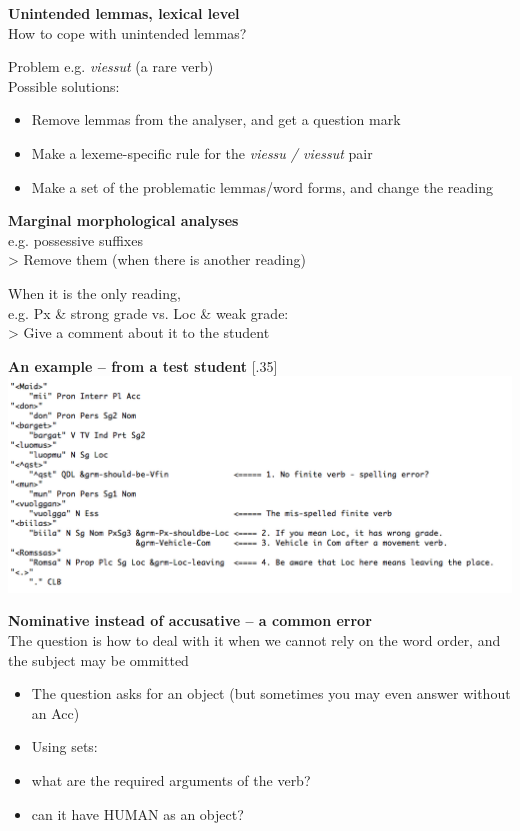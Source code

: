 \documentclass[landscape,norsk,11pt]{seminar}
\begin{document}
\begin{slide}
\newslide
\textbf{Unintended lemmas, lexical level} \\
How to cope with unintended lemmas?

Problem e.g. \textit{viessut} (a rare verb) \\
Possible solutions:

\begin{itemize}
\item{Remove lemmas from the analyser, and get a question mark}
\item{Make a lexeme-specific rule for the \textit{viessu / viessut} pair}
\item{Make a set of the problematic lemmas/word forms, and change the reading}
\end{itemize}


\newslide
\textbf{Marginal morphological analyses} \\
e.g. possessive suffixes \\
> Remove them (when there is another reading)

When it is the only reading, \\ e.g. Px \& strong grade vs. Loc \& weak grade: \\
> Give a comment about it to the student







\newslide
\textbf{An example -- from a test student}
\scalebox{.32}[.35]{\includegraphics{img/sentence_example.png}}

\newslide
\textbf{Nominative instead of accusative -- a common error} \\
The question is how to deal with it when we cannot rely on the word order, and the subject may be ommitted
\begin{itemize}
\item The question asks for an object (but sometimes you may even answer without an Acc)
\item Using sets:
\item what are the required arguments of the verb?
\item can it have HUMAN as an object? 
\end{itemize}


\end{slide}
\end{document}
